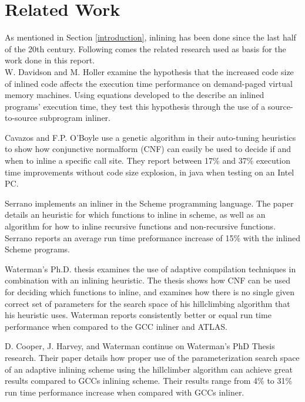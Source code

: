 
\section{Related Work}


As mentioned in Section \ref{introduction}, inlining has been done since the
last half of the 20th century. Following comes the related research used as
basis for the work done in this report. \\

W. Davidson and M. Holler \cite{SubprogInlining} examine the hypothesis that
the increased code size of inlined code affects the execution time performance on
demand-paged virtual memory machines. Using equations developed to the describe
an inlined programs' execution time, they test this hypothesis through the use
of a source-to-source subprogram inliner.

Cavazos and F.P. O'Boyle \cite{AutoTuningJavaHeuristics} use a genetic algorithm
in their auto-tuning heuristics to show how conjunctive normalform (CNF) can
easily be used to decide if and when to inline a specific call site. They report
between 17\% and 37\% execution time improvements without code size explosion,
in java when testing on an Intel PC.

Serrano \cite{InlineWhenHowSerrano} implements an inliner in the Scheme
programming language. The paper details an heuristic for which functions to
inline in scheme, as well as an algorithm for how to inline recursive functions
and non-recursive functions. Serrano reports an average run time preformance
increase of 15\% with the inlined Scheme programs.

Waterman's Ph.D. thesis \cite{AdaptvCompilAndInlingWaterman} examines the use of
adaptive compilation techniques in combination with an inlining heuristic. The
thesis shows how CNF can be used for deciding which functions to inline, and
examines how there is no single given correct set of parameters for the search
space of his hillclimbing algorithm that his heuristic uses. Waterman reports
consistently better or equal run time performance when compared to the GCC
inliner and ATLAS.

D. Cooper, J. Harvey, and Waterman \cite{AdaptvStratInlSubst} continue on
Waterman's PhD Thesis \cite{AdaptvCompilAndInlingWaterman} research. Their paper
details how proper use of the parameterization search space of an adaptive
inlining scheme using the hillclimber algorithm can achieve great results
compared to GCCs inlining scheme. Their results range from 4\% to 31\% run time
performance increase when compared with GCCs inliner.

